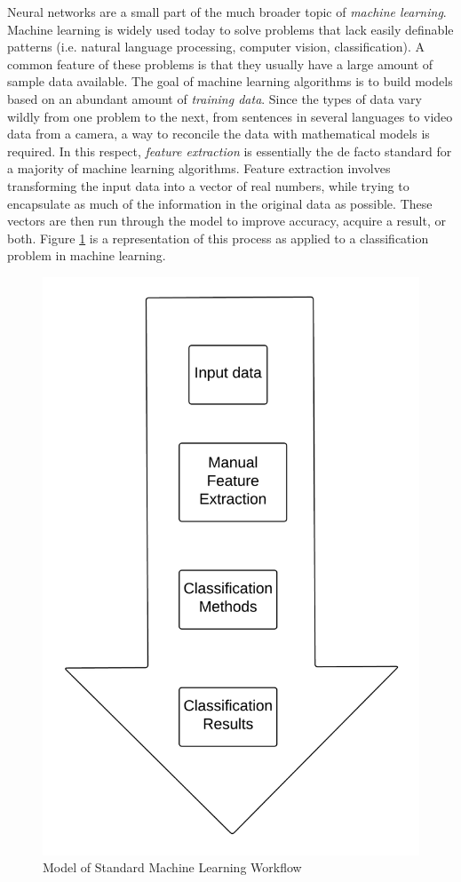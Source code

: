 \documentclass{sig-alternate}
\begin{document}
Neural networks are a small part of the much broader topic of \textit{machine learning}. Machine learning
is widely used today to solve problems that lack easily definable patterns (i.e. natural language processing,
computer vision, classification). A common feature of these problems is that they usually have a large amount
of sample data available. The goal of machine learning algorithms is to build models based on an
abundant amount of \textit{training data}. Since the types of data vary wildly from one problem to the next,
from sentences in several languages to video data from a camera, a way to reconcile the data with
mathematical models is required. In this respect, \textit{feature extraction} is essentially the de facto
standard for a majority of machine learning algorithms. Feature extraction involves transforming the
input data into a vector of real numbers, while trying to encapsulate as much of the information
in the original data as possible. These vectors are then run through the model to improve accuracy,
acquire a result, or both. Figure \ref{fig:mlworkflow} is a representation of this process as
applied to a classification problem in machine learning. 

\begin{figure}[h]
	\begin{center}
		\includegraphics[width=0.75\linewidth]{mlworkflow}
	\end{center}
	\vspace{-12pt}
	\caption{Model of Standard Machine Learning Workflow}
	\label{fig:mlworkflow}
\end{figure}
\end{document}
